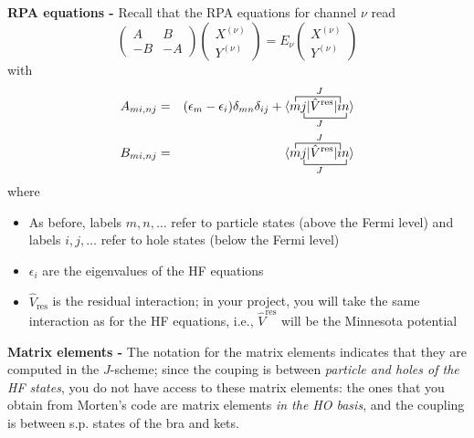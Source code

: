 {\bf RPA equations - } Recall that the RPA equations for channel $\nu$ read
\begin{equation}
\left(
\begin{array}{cc}
A & B \\
-B & -A
\end{array}
\right)
\left(
\begin{array}{c}
X^{(\nu)} \\
Y^{(\nu)} 
\end{array}
\right)
=
E_{\nu}
\left(
\begin{array}{c}
X^{(\nu)} \\
Y^{(\nu)}
\end{array}
\right)
\end{equation}
with
\begin{eqnarray}
A_{mi,nj} & = & (\epsilon_{m} - \epsilon_{i})\delta_{mn}\delta_{ij} + 
\underset{J}{
\overset{J}{
\acontraction{\langle }{m }{j | \hat{V}^{\text{res}} | }{i}
\bcontraction{\langle m }{j}{| \hat{V}^{\text{res}} i | }{n}
\langle m j | \hat{V}^{\text{res}} | i n \rangle
}
}
\label{eq:A}
\\
B_{mi,nj} & = & 
\underset{J}{
\overset{J}{
\acontraction{\langle }{m }{j | \hat{V}^{\text{res}} | }{i}
\bcontraction{\langle m }{j}{| \hat{V}^{\text{res}} i | }{n}
\langle m j | \hat{V}^{\text{res}} | i n \rangle
}
}
\label{eq:B}
\end{eqnarray}
where
\begin{itemize}
\item As before, labels $m, n, \dots$ refer to particle states (above the Fermi 
level) and labels $i,j, \dots$ refer to hole states (below the Fermi level)
\item $\epsilon_{i}$ are the eigenvalues of the HF equations
\item $\hat{V}_{\text{res}}$ is the residual interaction; in your project, you 
will take the same interaction as for the HF equations, i.e., 
$\hat{V}^{\text{res}}$ will be the Minnesota potential
\end{itemize}

{\bf Matrix elements - } The notation for the matrix elements indicates that 
they are computed in the $J$-scheme; since the couping is between {\em particle 
and holes of the HF states}, you do not have access to these matrix elements: 
the ones that you obtain from Morten's code are matrix elements {\em in the HO 
basis}, and the coupling is between s.p. states of the bra and kets. 

